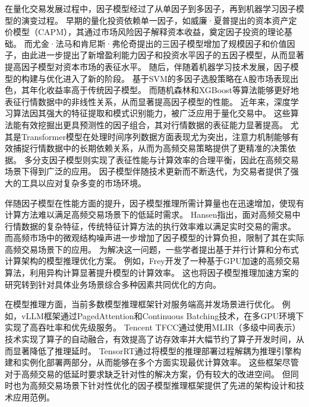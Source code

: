 在量化交易发展过程中，因子模型经过了从单因子到多因子，再到机器学习因子模型的演变过程。
早期的量化投资依赖单一因子，如威廉·夏普提出的资本资产定价模型（CAPM）\cite{sharpe1964capital}，其通过市场风险因子解释资本收益，奠定因子投资的理论基础。
而尤金·法马和肯尼斯·弗伦奇提出的三因子模型\cite{fama1993common}增加了规模因子和价值因子，由此进一步提出了新增盈利能力因子和投资水平因子的五因子模型\cite{fama2015five}，从而显著提高因子模型对资本市场的表征水平。
随后，伴随着机器学习技术发展，因子模型的构建与优化进入了新的阶段。
基于SVM的多因子选股策略在A股市场表现出色，其年化收益率高于传统因子模型\cite{bianchi2021bond}。
而随机森林和XGBoost等算法能够更好地表征行情数据中的非线性关系\cite{gu2021autoencoder}，从而显著提高因子模型的性能。
近年来，深度学习算法因其强大的特征提取和模式识别能力，被广泛应用于量化交易中\cite{chen2024deep}。
这些算法能有效挖掘出更具预测性的因子组合\cite{kozak2020shrinking}，其对行情数据的表征能力显著提高。
尤其是Transformer模型在处理时间序列数据方面表现尤为突出，注意力机制能够有效捕捉行情数据中的长期依赖关系，从而为高频交易策略提供了更精准的决策依据\cite{barez2023exploringadvantagestransformershighfrequency}。
多分支因子模型则实现了表征性能与计算效率的合理平衡，因此在高频交易场景下得到广泛的应用。
因子模型伴随技术更新而不断迭代，为交易者提供了强大的工具以应对复杂多变的市场环境。

伴随因子模型在性能方面的提升，因子模型推理所需计算量也在迅速增加，使现有计算方法难以满足高频交易场景下的低延时需求。
Hansen指出\cite{hansen2006realized}，面对高频交易中行情数据的复杂特征，传统特征计算方法的执行效率难以满足实时交易的需求。
而高频市场中的微观结构噪声进一步增加了因子模型的计算负担，限制了其在实际高频交易场景下的应用。
为解决这一问题，一些学者提出基于并行计算和分布式计算架构的模型推理优化方案。
例如，Frey\cite{frey2023jax}开发了一种基于GPU加速的高频交易算法，利用异构计算显著提升模型的计算效率。
这也将因子模型推理加速方案的研究转到针对具体业务场景综合多种因素共同优化的方向。

在模型推理方面，当前多数模型推理框架针对服务端高并发场景进行优化。
例如，vLLM框架通过PagedAttention和Continuous Batching技术，在多GPU环境下实现了高吞吐率和优先级服务\cite{kwon2023efficientmemorymanagementlarge}。
Tencent TFCC通过使用MLIR（多级中间表示）技术实现了算子的自动融合，有效提高了访存效率并大幅节约了算子开发时间，从而显著降低了推理延时\cite{lattner2020mlircompilerinfrastructureend}。
TensorRT通过将模型的推理部署过程解耦为推理引擎构建和实例化部署两部分，从而能够在多个方面实现最优计算效率。
这些框架尽管对于高频交易的低延时要求缺乏针对性的解决方案，仍有较大的改进空间。
但同时也为高频交易场景下针对性优化的因子模型推理框架提供了先进的架构设计和技术应用范例。

